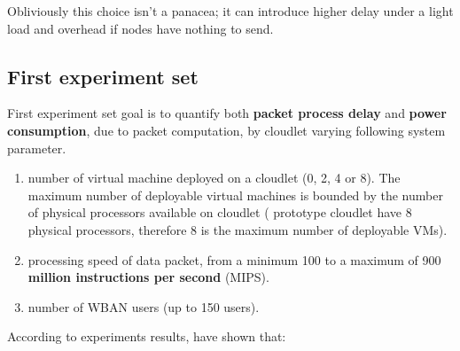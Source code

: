 \documentclass[sigchi]{acmart}
\begin{document}
Obliviously this choice isn't a panacea; it can introduce higher delay under a light load and overhead if nodes have nothing to send.\cite{schiller2003mobile}

\subsection{First experiment set}

First experiment set goal is to quantify both \textbf{packet process delay} and \textbf{power consumption}, due to packet computation, by cloudlet varying following system parameter.

\begin{enumerate}

\item number of virtual machine deployed on a cloudlet (0, 2, 4 or 8). The maximum number of deployable virtual machines is bounded by the number of physical processors available on cloudlet (\citet{MSAReport} prototype cloudlet have 8 physical processors, therefore 8 is the maximum number of deployable VMs).
 
\item processing speed of data packet, from a minimum 100 to a maximum of 900 \textbf{million instructions per second} (MIPS).

\item number of WBAN users (up to 150 users).

\end{enumerate}

According to experiments results, \cite{MSAReport} have shown that:
\end{document}
